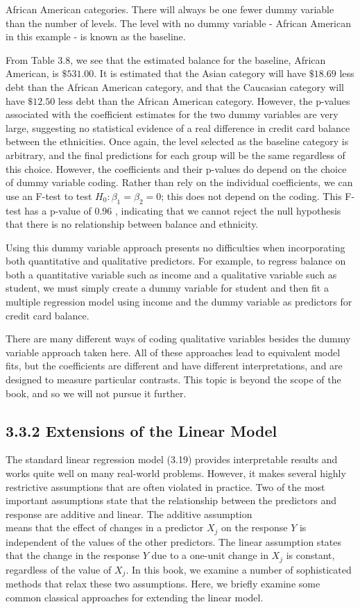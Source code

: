 \documentclass[10pt]{article}
\begin{document}
African American categories. There will always be one fewer dummy variable than the number of levels. The level with no dummy variable - African American in this example - is known as the baseline.

From Table 3.8, we see that the estimated balance for the baseline, African American, is $\$ 531.00$. It is estimated that the Asian category will have $\$ 18.69$ less debt than the African American category, and that the Caucasian category will have $\$ 12.50$ less debt than the African American category. However, the p-values associated with the coefficient estimates for the two dummy variables are very large, suggesting no statistical evidence of a real difference in credit card balance between the ethnicities. Once again, the level selected as the baseline category is arbitrary, and the final predictions for each group will be the same regardless of this choice. However, the coefficients and their p-values do depend on the choice of dummy variable coding. Rather than rely on the individual coefficients, we can use an F-test to test $H_{0}: \beta_{1}=\beta_{2}=0$; this does not depend on the coding. This F-test has a p-value of 0.96 , indicating that we cannot reject the null hypothesis that there is no relationship between balance and ethnicity.

Using this dummy variable approach presents no difficulties when incorporating both quantitative and qualitative predictors. For example, to regress balance on both a quantitative variable such as income and a qualitative variable such as student, we must simply create a dummy variable for student and then fit a multiple regression model using income and the dummy variable as predictors for credit card balance.

There are many different ways of coding qualitative variables besides the dummy variable approach taken here. All of these approaches lead to equivalent model fits, but the coefficients are different and have different interpretations, and are designed to measure particular contrasts. This topic is beyond the scope of the book, and so we will not pursue it further.

\subsection*{3.3.2 Extensions of the Linear Model}
The standard linear regression model (3.19) provides interpretable results and works quite well on many real-world problems. However, it makes several highly restrictive assumptions that are often violated in practice. Two of the most important assumptions state that the relationship between the predictors and response are additive and linear. The additive assumption\\
means that the effect of changes in a predictor $X_{j}$ on the response $Y$ is independent of the values of the other predictors. The linear assumption states that the change in the response $Y$ due to a one-unit change in $X_{j}$ is constant, regardless of the value of $X_{j}$. In this book, we examine a number of sophisticated methods that relax these two assumptions. Here, we briefly examine some common classical approaches for extending the linear model.
\end{document}
